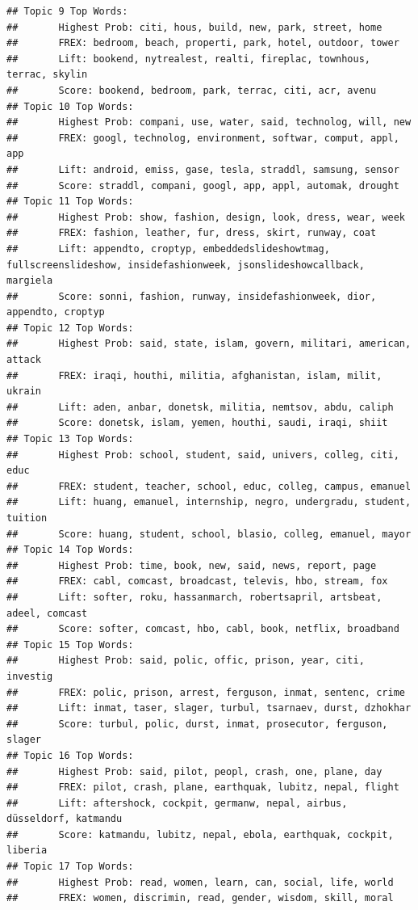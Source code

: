 \documentclass[12pt]{article}\usepackage[]{graphicx}\usepackage[]{color}
\makeatletter
\newenvironment{kframe}{%
 \def\at@end@of@kframe{}%
 \ifinner\ifhmode%
  \def\at@end@of@kframe{\end{minipage}}%
  \begin{minipage}{\columnwidth}%
 \fi\fi%
 \def\FrameCommand##1{\hskip\@totalleftmargin \hskip-\fboxsep
 \colorbox{shadecolor}{##1}\hskip-\fboxsep
     \hskip-\linewidth \hskip-\@totalleftmargin \hskip\columnwidth}%
 \MakeFramed {\advance\hsize-\width
   \@totalleftmargin\z@ \linewidth\hsize
   \@setminipage}}%
 {\par\unskip\endMakeFramed%
 \at@end@of@kframe}
\newenvironment{knitrout}{}{} %
\makeatother
\begin{document}
\begin{knitrout}
\begin{kframe}
\begin{verbatim}
## Topic 9 Top Words:
##  	 Highest Prob: citi, hous, build, new, park, street, home 
##  	 FREX: bedroom, beach, properti, park, hotel, outdoor, tower 
##  	 Lift: bookend, nytrealest, realti, fireplac, townhous, terrac, skylin 
##  	 Score: bookend, bedroom, park, terrac, citi, acr, avenu 
## Topic 10 Top Words:
##  	 Highest Prob: compani, use, water, said, technolog, will, new 
##  	 FREX: googl, technolog, environment, softwar, comput, appl, app 
##  	 Lift: android, emiss, gase, tesla, straddl, samsung, sensor 
##  	 Score: straddl, compani, googl, app, appl, automak, drought 
## Topic 11 Top Words:
##  	 Highest Prob: show, fashion, design, look, dress, wear, week 
##  	 FREX: fashion, leather, fur, dress, skirt, runway, coat 
##  	 Lift: appendto, croptyp, embeddedslideshowtmag, fullscreenslideshow, insidefashionweek, jsonslideshowcallback, margiela 
##  	 Score: sonni, fashion, runway, insidefashionweek, dior, appendto, croptyp 
## Topic 12 Top Words:
##  	 Highest Prob: said, state, islam, govern, militari, american, attack 
##  	 FREX: iraqi, houthi, militia, afghanistan, islam, milit, ukrain 
##  	 Lift: aden, anbar, donetsk, militia, nemtsov, abdu, caliph 
##  	 Score: donetsk, islam, yemen, houthi, saudi, iraqi, shiit 
## Topic 13 Top Words:
##  	 Highest Prob: school, student, said, univers, colleg, citi, educ 
##  	 FREX: student, teacher, school, educ, colleg, campus, emanuel 
##  	 Lift: huang, emanuel, internship, negro, undergradu, student, tuition 
##  	 Score: huang, student, school, blasio, colleg, emanuel, mayor 
## Topic 14 Top Words:
##  	 Highest Prob: time, book, new, said, news, report, page 
##  	 FREX: cabl, comcast, broadcast, televis, hbo, stream, fox 
##  	 Lift: softer, roku, hassanmarch, robertsapril, artsbeat, adeel, comcast 
##  	 Score: softer, comcast, hbo, cabl, book, netflix, broadband 
## Topic 15 Top Words:
##  	 Highest Prob: said, polic, offic, prison, year, citi, investig 
##  	 FREX: polic, prison, arrest, ferguson, inmat, sentenc, crime 
##  	 Lift: inmat, taser, slager, turbul, tsarnaev, durst, dzhokhar 
##  	 Score: turbul, polic, durst, inmat, prosecutor, ferguson, slager 
## Topic 16 Top Words:
##  	 Highest Prob: said, pilot, peopl, crash, one, plane, day 
##  	 FREX: pilot, crash, plane, earthquak, lubitz, nepal, flight 
##  	 Lift: aftershock, cockpit, germanw, nepal, airbus, düsseldorf, katmandu 
##  	 Score: katmandu, lubitz, nepal, ebola, earthquak, cockpit, liberia 
## Topic 17 Top Words:
##  	 Highest Prob: read, women, learn, can, social, life, world 
##  	 FREX: women, discrimin, read, gender, wisdom, skill, moral 

\end{verbatim}
\end{kframe}
\end{knitrout}
\end{document}
